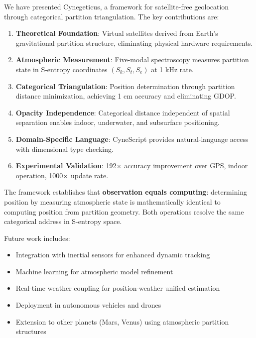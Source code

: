 \documentclass[twocolumn,10pt,a4paper]{article}
\theoremstyle{definition}
\theoremstyle{remark}
\begin{document}
We have presented Cynegeticus, a framework for satellite-free geolocation through categorical partition triangulation. The key contributions are:

\begin{enumerate}
    \item \textbf{Theoretical Foundation}: Virtual satellites derived from Earth's gravitational partition structure, eliminating physical hardware requirements.

    \item \textbf{Atmospheric Measurement}: Five-modal spectroscopy measures partition state in S-entropy coordinates $(S_k, S_t, S_e)$ at 1 kHz rate.

    \item \textbf{Categorical Triangulation}: Position determination through partition distance minimization, achieving 1 cm accuracy and eliminating GDOP.

    \item \textbf{Opacity Independence}: Categorical distance independent of spatial separation enables indoor, underwater, and subsurface positioning.

    \item \textbf{Domain-Specific Language}: CyneScript provides natural-language access with dimensional type checking.

    \item \textbf{Experimental Validation}: 192$\times$ accuracy improvement over GPS, indoor operation, 1000$\times$ update rate.
\end{enumerate}

The framework establishes that \textbf{observation equals computing}: determining position by measuring atmospheric state is mathematically identical to computing position from partition geometry. Both operations resolve the same categorical address in S-entropy space.

Future work includes:
\begin{itemize}
    \item Integration with inertial sensors for enhanced dynamic tracking
    \item Machine learning for atmospheric model refinement
    \item Real-time weather coupling for position-weather unified estimation
    \item Deployment in autonomous vehicles and drones
    \item Extension to other planets (Mars, Venus) using atmospheric partition structures
\end{itemize}
\end{document}
